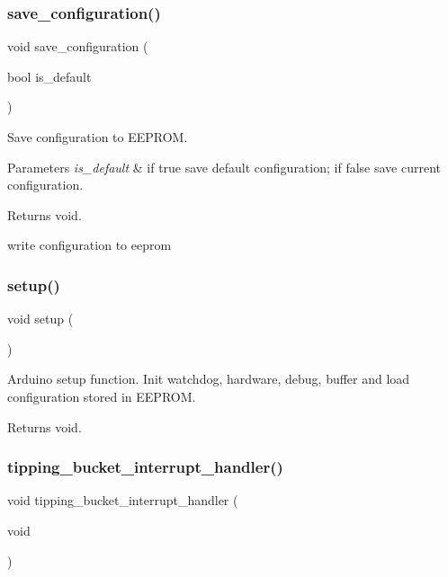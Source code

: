 \subsubsection{\texorpdfstring{save\+\_\+configuration()}{save\_configuration()}}
{\footnotesize\ttfamily void save\+\_\+configuration (\begin{DoxyParamCaption}\item[{bool}]{is\+\_\+default }\end{DoxyParamCaption})}



Save configuration to E\+E\+P\+R\+OM. 


\begin{DoxyParams}{Parameters}
{\em is\+\_\+default} & if true save default configuration; if false save current configuration. \\
\hline
\end{DoxyParams}
\begin{DoxyReturn}{Returns}
void. 
\end{DoxyReturn}
write configuration to eeprom \mbox{\label{i2c-rain_8ino_a4fc01d736fe50cf5b977f755b675f11d}} 
\subsubsection{\texorpdfstring{setup()}{setup()}}
{\footnotesize\ttfamily void setup (\begin{DoxyParamCaption}{ }\end{DoxyParamCaption})}



Arduino setup function. Init watchdog, hardware, debug, buffer and load configuration stored in E\+E\+P\+R\+OM. 

\begin{DoxyReturn}{Returns}
void. 
\end{DoxyReturn}
\mbox{\label{i2c-rain_8ino_a368e45fb147aecb0fd1478d3cc76fba7}} 
\subsubsection{\texorpdfstring{tipping\+\_\+bucket\+\_\+interrupt\+\_\+handler()}{tipping\_bucket\_interrupt\_handler()}}
{\footnotesize\ttfamily void tipping\+\_\+bucket\+\_\+interrupt\+\_\+handler (\begin{DoxyParamCaption}\item[{void}]{ }\end{DoxyParamCaption})}



